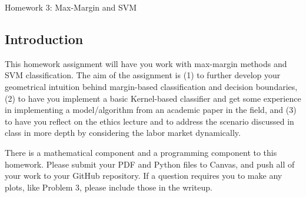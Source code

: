 \documentclass[submit]{harvardml}
\begin{document}
\begin{center}
{\Large Homework 3: Max-Margin and SVM}\\
\end{center}
\subsection*{Introduction}

This homework assignment will have you work with max-margin methods
and SVM classification. The aim of the assignment is (1) to further
develop your geometrical intuition behind margin-based classification
and decision boundaries, (2) to have you implement a basic Kernel-based
classifier and get some experience in implementing a model/algorithm
from an academic paper in the field, and (3) to have you reflect on the
ethics lecture and to address the scenario discussed in class
in more depth by considering the labor market dynamically.

There is a mathematical component and a programming component to this
homework.  Please submit your PDF and Python files to Canvas, and push
all of your work to your GitHub repository. If a question requires you
to make any plots, like Problem 3, please include those in the
writeup.
\end{document}

